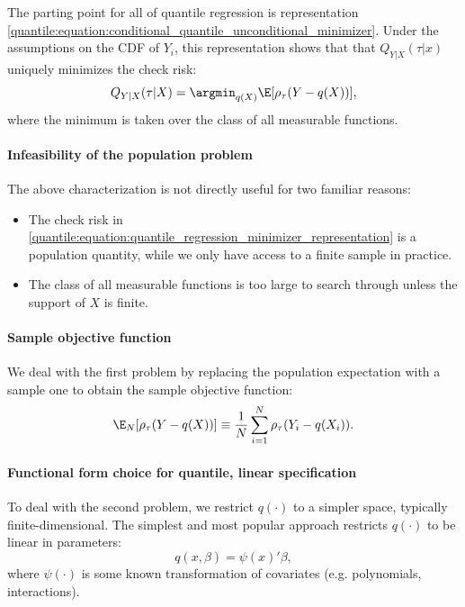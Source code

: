 The parting point for all of quantile regression is representation \eqref{quantile:equation:conditional_quantile_unconditional_minimizer}. Under the assumptions on the CDF of $Y_i$, this representation  shows that that   $Q_{Y|X}(\tau|x)$  uniquely minimizes the check risk: 
\begin{equation}\label{quantile:equation:quantile_regression_minimizer_representation}
	Q_{Y|X}(\tau|X)  =  \argmin_{q(X)}  \E[\rho_{\tau}(Y-q(X))],
\end{equation}
where the minimum is taken over the class of all measurable functions. 


\paragraph{Infeasibility of the population problem}

The above characterization is not directly useful for two familiar reasons:
\begin{itemize}
	\item The check risk in \eqref{quantile:equation:quantile_regression_minimizer_representation} is a population quantity, while we only have access to a finite sample in practice. 
	\item The class of all measurable functions is too large to search through unless the support of $X$ is finite. 
\end{itemize}

\paragraph{Sample objective function}

We deal with the first problem by replacing the population expectation with a sample one to obtain the sample objective function:
\begin{equation}
	 \E_N[\rho_{\tau}(Y-q(X))] \equiv \dfrac{1}{N} \sum_{i=1}^N \rho_{\tau} (Y_i - q(X_i)). 
\end{equation}


\paragraph{Functional form choice for quantile, linear specification}
 
To deal with the second problem, we restrict $q(\cdot)$ to a simpler space, typically finite-dimensional. 
The simplest and most popular approach restricts $q(\cdot)$ to be linear in parameters:
\begin{equation}
	q(x, \beta) = \psi(x)'\beta,
\end{equation}
where $\psi(\cdot)$ is some known transformation of covariates (e.g. polynomials, interactions).
%

